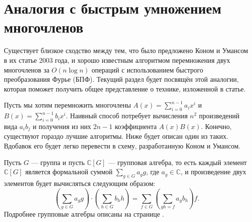 \section{Аналогия с быстрым умножением многочленов}

Существует близкое сходство между тем, что было предложено Коном и Умансом в их статье 2003 года, и хорошо известным алгоритмом перемножения двух многочленов за $O(n \log n)$ операций с использованием быстрого преобразования Фурье (БПФ). Текущий раздел будет посвящён этой аналогии, которая поможет получить общее представление о технике, изложенной в статье.

Пусть мы хотим перемножить многочлены $A(x)=\sum_{i=0}^{n-1} a_i x^i$ и $B(x)=\sum_{i=0}^{n-1} b_i x^i$. Наивный способ потребует вычисления $n^2$ произведений вида $a_i b_j$ и получения из них $2n-1$ коэффициента $A(x)B(x)$. Конечно, существуют гораздо лучшие алгоритмы. Ниже будет описан один из таких. Вдобавок его будет легко перевести в схему, разработанную Коном и Умансом.

Пусть $G$ --- группа и пусть $\mathbb{C}[G]$ --- групповая алгебра, то есть каждый элемент $\mathbb{C}[G]$ является формальной суммой $\sum_{g \in G} a_g g$, где $a_g \in \mathbb{C}$, и произведение двух элементов будет вычисляться следующим образом:
\[
	\left( \sum_{g \in G} a_g g \right) \cdot \left( \sum_{h \in G} b_h h \right) = \sum_{f \in G} \left( \sum_{gh=f} a_g b_h \right) f.
\]
Подробнее групповые алгебры описаны на странице \pageref{group_algebra}.

